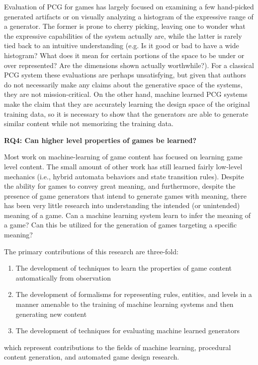 \documentclass[12pt]{report}
\begin{document}
Evaluation of PCG for games has largely focused on examining a few hand-picked generated artifacts or on visually analyzing a histogram of the expressive range of a generator.  The former is prone to cherry picking, leaving one to wonder what the expressive capabilities of the system actually are, while the latter is rarely tied back to an intuitive understanding (e.g. Is it good or bad to have a wide histogram? What does it mean for certain portions of the space to be under or over represented? Are the dimensions shown actually worthwhile?).  For a classical PCG system these evaluations are perhaps unsatisfying, but given that authors do not necessarily make any claims about the generative space of the systems, they are not mission-critical.  On the other hand, machine learned PCG systems make the claim that they are accurately learning the design space of the original training data, so it is necessary to show that the generators are able to generate similar content while not memorizing the training data.


\textbf{RQ4: Can higher level properties of games be learned?}

Most work on machine-learning of game content has focused on learning game level content.  The small amount of other work has still learned fairly low-level mechanics (i.e., hybrid automata behaviors and state transition rules).  Despite the ability for games to convey great meaning, and furthermore, despite the presence of game generators that intend to generate games with meaning, there has been very little research into understanding the intended (or unintended) meaning of a game. Can a machine learning system learn to infer the meaning of a game?  Can this be utilized for the generation of games targeting a specific meaning?



The primary contributions of this research are three-fold:
\begin{enumerate}
\item The development of techniques to learn the properties of game content automatically from observation
\item The development of formalisms for representing rules, entities, and levels in a manner amenable to the training of machine learning systems and then generating new content 
\item The development of techniques for evaluating machine learned generators
\end{enumerate}


\noindent which represent contributions to the fields of machine learning, procedural content generation, and automated game design research.
\end{document}
